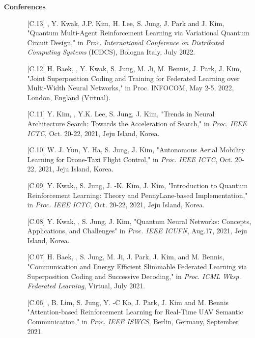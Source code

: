 \documentclass[10pt,letterpaper]{article}
\begin{document}
\headedsection
  {\textbf{Conferences}}
  {} {
      \vspace{0.3mm}
      \vspace{-0.7mm}
      \begin{itemize} \itemsep=-0.1mm
      \item[]
      \begin{itemize}
      \item[\textsf{[C.13]}] 
        , Y. Kwak, J.P. Kim, H. Lee, S. Jung, J. Park and J. Kim, "Quantum Multi-Agent Reinforcement Learning via Variational Quantum Circuit Design," in \textit{Proc. International Conference on Distributed Computing Systems} (ICDCS), Bologna Italy,  July 2022.
      \item[\textsf{[C.12]}] 
      H. Baek, , Y. Kwak, S. Jung, M. Ji, M. Bennis, J. Park, J. Kim, "Joint Superposition Coding and Training for Federated Learning over Multi-Width Neural Networks," in Proc. INFOCOM, May 2-5, 2022, London, England (Virtual).
      \item[\textsf{[C.11]}] 
      Y. Kim, , Y.K. Lee, S. Jung, J. Kim, "Trends in Neural Architecture Search: Towards the Acceleration of Search," in \textit{Proc. IEEE ICTC}, Oct. 20-22, 2021, Jeju Island, Korea.
      \item[\textsf{[C.10]}] 
      W. J. Yun, Y. Ha,  S. Jung,  J. Kim, "Autonomous Aerial Mobility Learning for Drone-Taxi Flight Control," in\textit{ Proc. IEEE ICTC}, Oct. 20-22, 2021, Jeju Island, Korea.
      \item[\textsf{[C.09]}] Y. Kwak,, S. Jung, J. -K. Kim, J. Kim, "Introduction to Quantum Reinforcement Learning: Theory and PennyLane-based Implementation," in \textit{Proc. IEEE ICTC}, Oct. 20-22, 2021, Jeju Island, Korea.
      
      \item[\textsf{[C.08]}] Y. Kwak, , S. Jung, J. Kim, "Quantum Neural Networks: Concepts, Applications, and Challenges" in \textit{Proc. IEEE ICUFN}, Aug.17, 2021, Jeju Island, Korea.
      
      \item[\textsf{[C.07]}] H. Baek, , S. Jung, M. Ji, J. Park, J. Kim, and  M. Bennis, "Communication and Energy Efficient Slimmable Federated Learning via Superposition Coding and Successive Decoding," in \textit{Proc. ICML Wksp. Federated Learning}, Virtual, July 2021.
      
      \item[\textsf{[C.06]}] , B. Lim, S. Jung, Y. -C Ko, J. Park, J. Kim and M. Bennis "Attention-based Reinforcement Learning for Real-Time UAV Semantic Communication," in \textit{Proc. IEEE ISWCS}, Berlin, Germany, September 2021. 
      

\end{itemize}
\end{itemize}}
\end{document}
